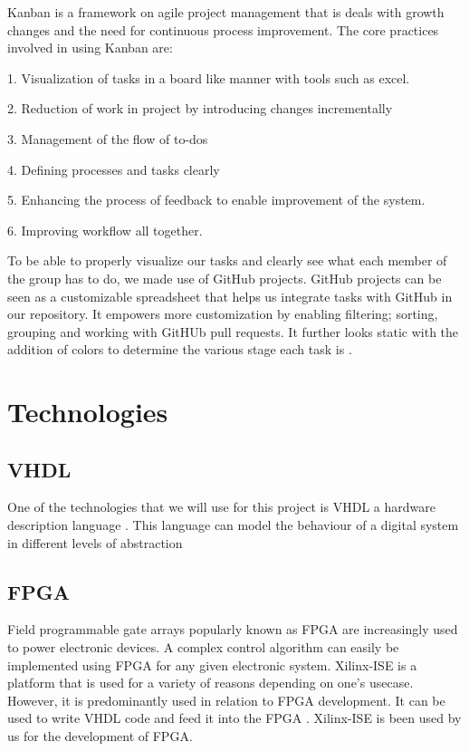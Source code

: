 \documentclass[12pt]{article}
\begin{document}
Kanban is a framework on agile project management that is deals with growth changes and the need for continuous process improvement. The core practices involved in using Kanban are: 

1.	Visualization of tasks in a board like manner with tools such as excel. 

2.	Reduction of work in project by introducing changes incrementally 

3.	Management of the flow of to-dos

4.	Defining processes and tasks clearly

5.	Enhancing the process of feedback to enable improvement of the system.

6.	Improving workflow all together. 

To be able to properly visualize our tasks and clearly see what each member of the group has to do, we made use of GitHub projects. GitHub projects can be seen as a customizable spreadsheet that helps us integrate tasks with GitHub in our repository. It empowers more customization by enabling filtering; sorting, grouping and working with GitHUb pull requests. It further looks static with the addition of colors to determine the various stage each task is \cite{kanvanize}.


\section{Technologies}

\subsection{VHDL}

One of the technologies that we will use for this project is VHDL a hardware description language \cite{vhdl}. This language can model the behaviour of a digital system in different levels of abstraction \cite{vhdl}

\subsection{FPGA}

Field programmable gate arrays popularly known as FPGA are increasingly used to power electronic devices. A complex control algorithm can easily be implemented using FPGA for any given electronic system. Xilinx-ISE is a platform that is used for a variety of reasons depending on one’s usecase. However, it is predominantly used in relation to FPGA development. It can be used to write VHDL code and feed it into the FPGA \cite{fpga}. Xilinx-ISE is been used by us for the development of FPGA.
\end{document}
